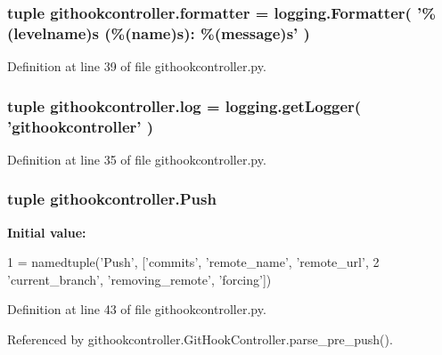 \subsubsection[{formatter}]{\setlength{\rightskip}{0pt plus 5cm}tuple githookcontroller.\-formatter = logging.\-Formatter( '\%(levelname)s (\%(name)s)\-: \%(message)s' )}\label{namespacegithookcontroller_a8672f684f117c8c4733546a0bc9e9616}


Definition at line 39 of file githookcontroller.\-py.

\subsubsection[{log}]{\setlength{\rightskip}{0pt plus 5cm}tuple githookcontroller.\-log = logging.\-get\-Logger( 'githookcontroller' )}\label{namespacegithookcontroller_a3bbdf7a562461bd3baca4ef635d6dd50}


Definition at line 35 of file githookcontroller.\-py.

\subsubsection[{Push}]{\setlength{\rightskip}{0pt plus 5cm}tuple githookcontroller.\-Push}\label{namespacegithookcontroller_ae617d8e0c886ed4e082bd11f1f33bd0d}
{\bfseries Initial value\-:}
\begin{DoxyCode}
1 = namedtuple(\textcolor{stringliteral}{'Push'}, [\textcolor{stringliteral}{'commits'}, \textcolor{stringliteral}{'remote\_name'}, \textcolor{stringliteral}{'remote\_url'},
2                            \textcolor{stringliteral}{'current\_branch'}, \textcolor{stringliteral}{'removing\_remote'}, \textcolor{stringliteral}{'forcing'}])
\end{DoxyCode}


Definition at line 43 of file githookcontroller.\-py.



Referenced by githookcontroller.\-Git\-Hook\-Controller.\-parse\-\_\-pre\-\_\-push().

